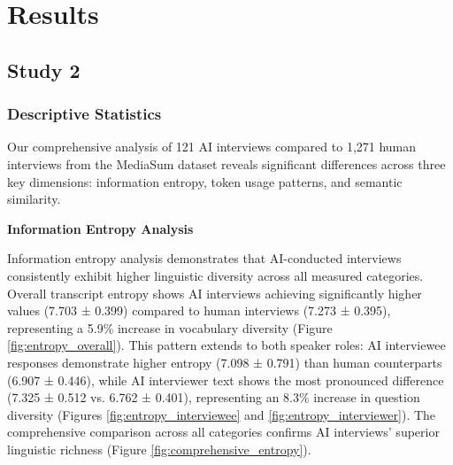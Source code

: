 \documentclass[sigchi,nonacm,manuscript]{acmart}
\begin{document}
\section{Results}

\subsection{Study 2}
\subsubsection{Descriptive Statistics}
Our comprehensive analysis of 121 AI interviews compared to 1,271 human interviews from the MediaSum dataset reveals significant differences across three key dimensions: information entropy, token usage patterns, and semantic similarity.

\textbf{Information Entropy Analysis}

Information entropy analysis demonstrates that AI-conducted interviews consistently exhibit higher linguistic diversity across all measured categories. Overall transcript entropy shows AI interviews achieving significantly higher values (7.703 ± 0.399) compared to human interviews (7.273 ± 0.395), representing a 5.9\% increase in vocabulary diversity (Figure \ref{fig:entropy_overall}). This pattern extends to both speaker roles: AI interviewee responses demonstrate higher entropy (7.098 ± 0.791) than human counterparts (6.907 ± 0.446), while AI interviewer text shows the most pronounced difference (7.325 ± 0.512 vs. 6.762 ± 0.401), representing an 8.3\% increase in question diversity (Figures \ref{fig:entropy_interviewee} and \ref{fig:entropy_interviewer}). The comprehensive comparison across all categories confirms AI interviews' superior linguistic richness (Figure \ref{fig:comprehensive_entropy}).
\end{document}
